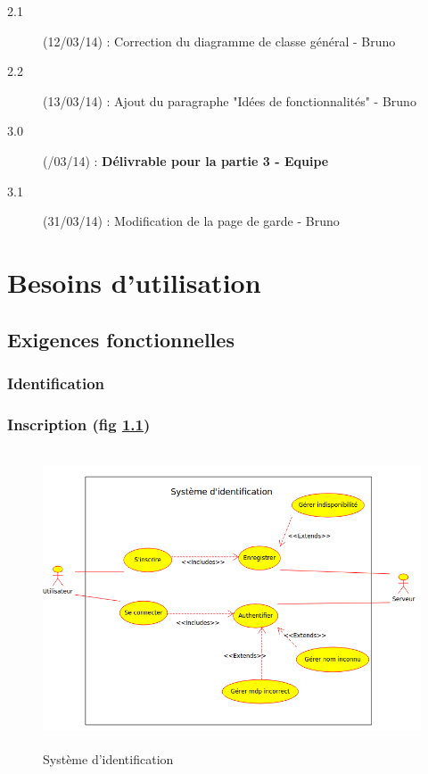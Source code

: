 \documentclass[a4paper]{report}
\begin{document}
\begin{description}
    \item[2.1] (12/03/14) : Correction du diagramme de classe général - Bruno
    \item[2.2] (13/03/14) : Ajout du paragraphe "Idées de fonctionnalités" - Bruno
    \item[3.0] (/03/14) : \textbf{Délivrable pour la partie 3 - Equipe}
    
    \item[3.1] (31/03/14) : Modification de la page de garde - Bruno
    


\end{description}


\chapter{Besoins d'utilisation}
\section{Exigences fonctionnelles}

\subsection{Identification}

\subsection{Inscription (fig \ref{diag-use-inscription})}

\begin{figure}[H]
    \begin{center}
        \includegraphics[height=250pt]{uml/id.png}
        \caption{\label{diag-use-inscription} Système d'identification}
    \end{center}
\end{figure}
\end{document}
